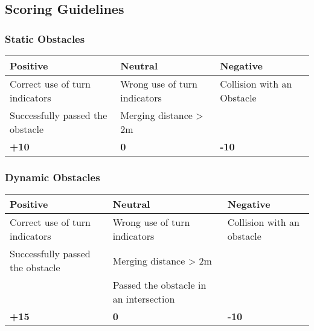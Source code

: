 {	\newpage

	\subsection{Scoring Guidelines}
	\label{obstacle_scoring_guidelines}

	\subsubsection*{Static Obstacles}
	\begin{table}[H]
		\begin{tabularx}{\textwidth}{XXX}
			\toprule
			\textbf{Positive}                & \textbf{Neutral}             & \textbf{Negative}          \\
			\midrule
			Correct use of turn indicators   & Wrong use of turn indicators & Collision with an Obstacle \\
			Successfully passed the obstacle & Merging distance > 2m        &                            \\
			\topstrut
			\textbf{+10}                     & \textbf{0}                   & \textbf{-10}               \\
			\bottomrule
		\end{tabularx}
	\end{table}

	\subsubsection*{Dynamic Obstacles}
	\begin{table}[H]
		\begin{tabularx}{\textwidth}{XXX}
			\toprule
			\textbf{Positive}                & \textbf{Neutral}                        & \textbf{Negative}          \\
			\midrule
			Correct use of turn indicators   & Wrong use of turn indicators            & Collision with an obstacle \\
			Successfully passed the obstacle & Merging distance > 2m                   &                            \\
			                                 & Passed the obstacle in an intersection  &                            \\
			\topstrut
			\textbf{+15}                     & \textbf{0}                              & \textbf{-10}               \\
			\bottomrule
		\end{tabularx}
	\end{table}

}
